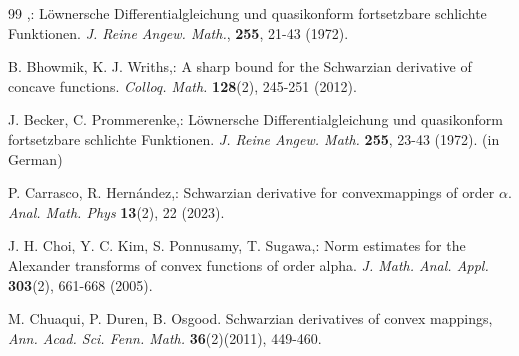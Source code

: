 \documentclass[a4paper,12pt]{amsart}
\theoremstyle{plain}
\theoremstyle{definition}
\theoremstyle{plain}
\begin{document}
\begin{thebibliography}{99}
,: Löwnersche Differentialgleichung und quasikonform fortsetzbare schlichte Funktionen. \textit{ J.	Reine Angew. Math.}, \textbf{255}, 21-43 (1972).

 {\sc B. Bhowmik}, {\sc K. J. Wriths},: A sharp bound for the Schwarzian derivative of concave functions. \textit{Colloq. Math.} \textbf{128}(2), 245-251 (2012). 

 {\sc J. Becker}, {\sc C. Prommerenke},: Löwnersche Differentialgleichung und quasikonform fortsetzbare schlichte Funktionen.  \textit{J. Reine Angew. Math.} \textbf{255}, 23-43 (1972). (in German) 

 {\sc P. Carrasco}, {\sc R. Hern\'andez},: Schwarzian derivative for convexmappings of order $\alpha$.  \textit{Anal. Math. Phys} \textbf{13}(2), 22 (2023).


 {\sc J. H. Choi}, {\sc Y. C. Kim}, {\sc S. Ponnusamy}, {\sc T. Sugawa},: Norm estimates for the Alexander transforms of	convex functions of order alpha. \textit{J. Math. Anal. Appl.} \textbf{303}(2), 661-668 (2005).



 {\sc  M. Chuaqui, P. Duren}, {\sc B. Osgood}. Schwarzian derivatives of convex mappings, \emph{Ann. Acad. Sci. Fenn. Math.} \textbf{36}(2)(2011), 449-460. 



\end{thebibliography}
\end{document}
